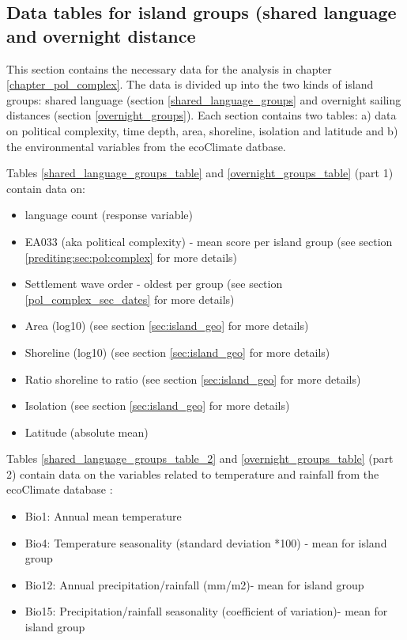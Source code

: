 \documentclass[a4paper,10pt]{article} %
\begin{document}
\subsection{Data tables for island groups (shared language and overnight distance}
\singlespacing
This section contains the necessary data for the analysis in chapter \ref{chapter_pol_complex}. The data is divided up into the two kinds of island groups: shared language (section \ref{shared_language_groups} and overnight sailing distances (section \ref{overnight_groups}). Each section contains two tables: a) data on political complexity, time depth, area, shoreline, isolation and latitude and b) the environmental variables from the ecoClimate datbase.

Tables \ref{shared_language_groups_table} and \ref{overnight_groups_table} (part 1) contain data on:

\begin{itemize}
\item language count (response variable)
\item EA033 (aka political complexity) - mean score per island group (see section \ref{prediting:sec:pol:complex} for more details)
\item Settlement wave order - oldest per group (see section \ref{pol_complex_sec_dates} for more details)
\item Area (log10) (see section \ref{sec:island_geo} for more details)
\item Shoreline (log10) (see section \ref{sec:island_geo} for more details)
\item Ratio shoreline to ratio (see section \ref{sec:island_geo} for more details)
\item Isolation (see section \ref{sec:island_geo} for more details)
\item Latitude (absolute mean)
\end{itemize}

Tables \ref{shared_language_groups_table_2} and \ref{overnight_groups_table} (part 2) contain data on the variables related to temperature and rainfall from the ecoClimate database \citep{ecoclimate}:

\begin{itemize}
\item Bio1: Annual mean temperature
\item Bio4: Temperature seasonality (standard deviation *100) - mean for island group
\item Bio12: Annual precipitation/rainfall (mm/m2)- mean for island group
\item Bio15: Precipitation/rainfall seasonality (coefficient of variation)- mean for island group
\end{itemize}
\end{document}
